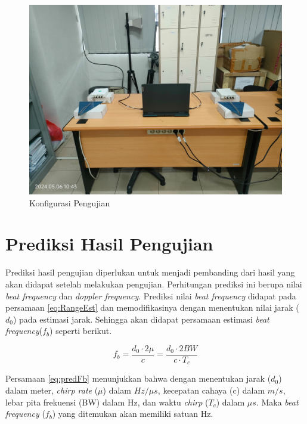 \begin{figure}
	\begin{center}
		\includegraphics[scale=0.09]{pics/bab3/konfigurasiPengujian.jpg}
		\caption{Konfigurasi Pengujian}
		\label{img:konfigurasi}
	\end{center}
\end{figure}


\section{Prediksi Hasil Pengujian}

Prediksi hasil pengujian diperlukan untuk menjadi pembanding dari hasil yang akan didapat setelah melakukan pengujian. Perhitungan prediksi ini berupa nilai \textit{beat frequency} dan \textit{doppler frequency}. Prediksi nilai \textit{beat frequency} didapat pada persamaan \ref{eq:RangeEst} dan memodifikasinya dengan menentukan nilai jarak ($d_{0}$) pada estimasi jarak. Sehingga akan didapat persamaan estimasi \textit{beat frequency}($f_{b}$) seperti berikut.

\begin{equation}
	f_{b} = \frac{d_{0} \cdot 2 \mu}{c} = \frac{d_{0} \cdot 2BW}{c \cdot T_{c}}
	\label{eq:predFb}
\end{equation}

Persamaan \ref{eq:predFb} menunjukkan bahwa dengan menentukan jarak ($d_{0}$) dalam meter, \textit{chirp rate} ($\mu$) dalam $Hz/\mu s$, kecepatan cahaya (c) dalam $m/s$, lebar pita frekuensi (BW) dalam Hz, dan waktu \textit{chirp} ($T_{c}$) dalam $\mu s$. Maka \textit{beat frequency} ($f_{b}$) yang ditemukan akan memiliki satuan Hz.



